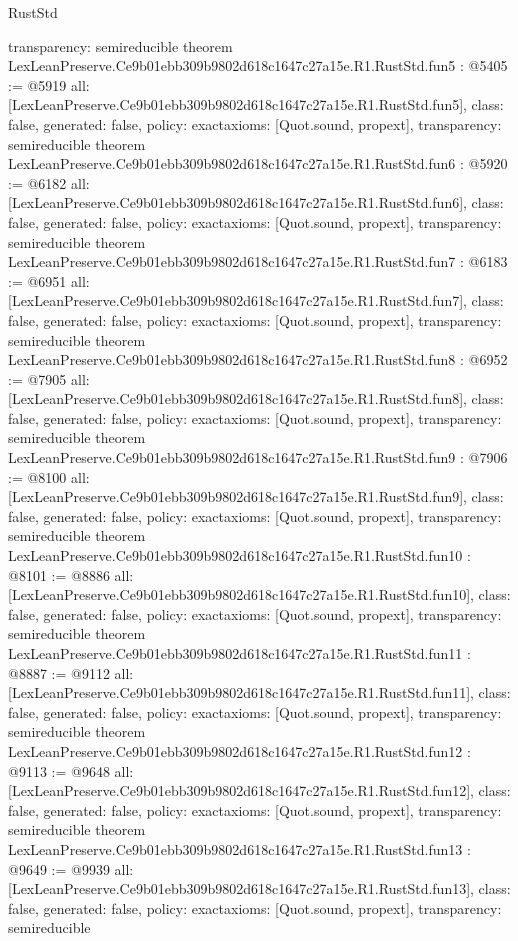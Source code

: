 \begin{lexlean}{RustStd}
\begin{coremodule}
{  transparency: semireducible
}
theorem LexLeanPreserve.Ce9b01ebb309b9802d618c1647c27a15e.R1.RustStd.fun5 : @5405 := @5919 {
  all: [LexLeanPreserve.Ce9b01ebb309b9802d618c1647c27a15e.R1.RustStd.fun5],
  class: false,
  generated: false,
  policy: exact{axioms: [Quot.sound, propext]},
  transparency: semireducible
}
theorem LexLeanPreserve.Ce9b01ebb309b9802d618c1647c27a15e.R1.RustStd.fun6 : @5920 := @6182 {
  all: [LexLeanPreserve.Ce9b01ebb309b9802d618c1647c27a15e.R1.RustStd.fun6],
  class: false,
  generated: false,
  policy: exact{axioms: [Quot.sound, propext]},
  transparency: semireducible
}
theorem LexLeanPreserve.Ce9b01ebb309b9802d618c1647c27a15e.R1.RustStd.fun7 : @6183 := @6951 {
  all: [LexLeanPreserve.Ce9b01ebb309b9802d618c1647c27a15e.R1.RustStd.fun7],
  class: false,
  generated: false,
  policy: exact{axioms: [Quot.sound, propext]},
  transparency: semireducible
}
theorem LexLeanPreserve.Ce9b01ebb309b9802d618c1647c27a15e.R1.RustStd.fun8 : @6952 := @7905 {
  all: [LexLeanPreserve.Ce9b01ebb309b9802d618c1647c27a15e.R1.RustStd.fun8],
  class: false,
  generated: false,
  policy: exact{axioms: [Quot.sound, propext]},
  transparency: semireducible
}
theorem LexLeanPreserve.Ce9b01ebb309b9802d618c1647c27a15e.R1.RustStd.fun9 : @7906 := @8100 {
  all: [LexLeanPreserve.Ce9b01ebb309b9802d618c1647c27a15e.R1.RustStd.fun9],
  class: false,
  generated: false,
  policy: exact{axioms: [Quot.sound, propext]},
  transparency: semireducible
}
theorem LexLeanPreserve.Ce9b01ebb309b9802d618c1647c27a15e.R1.RustStd.fun10 : @8101 := @8886 {
  all: [LexLeanPreserve.Ce9b01ebb309b9802d618c1647c27a15e.R1.RustStd.fun10],
  class: false,
  generated: false,
  policy: exact{axioms: [Quot.sound, propext]},
  transparency: semireducible
}
theorem LexLeanPreserve.Ce9b01ebb309b9802d618c1647c27a15e.R1.RustStd.fun11 : @8887 := @9112 {
  all: [LexLeanPreserve.Ce9b01ebb309b9802d618c1647c27a15e.R1.RustStd.fun11],
  class: false,
  generated: false,
  policy: exact{axioms: [Quot.sound, propext]},
  transparency: semireducible
}
theorem LexLeanPreserve.Ce9b01ebb309b9802d618c1647c27a15e.R1.RustStd.fun12 : @9113 := @9648 {
  all: [LexLeanPreserve.Ce9b01ebb309b9802d618c1647c27a15e.R1.RustStd.fun12],
  class: false,
  generated: false,
  policy: exact{axioms: [Quot.sound, propext]},
  transparency: semireducible
}
theorem LexLeanPreserve.Ce9b01ebb309b9802d618c1647c27a15e.R1.RustStd.fun13 : @9649 := @9939 {
  all: [LexLeanPreserve.Ce9b01ebb309b9802d618c1647c27a15e.R1.RustStd.fun13],
  class: false,
  generated: false,
  policy: exact{axioms: [Quot.sound, propext]},
  transparency: semireducible
}
\end{coremodule}
\end{lexlean}
